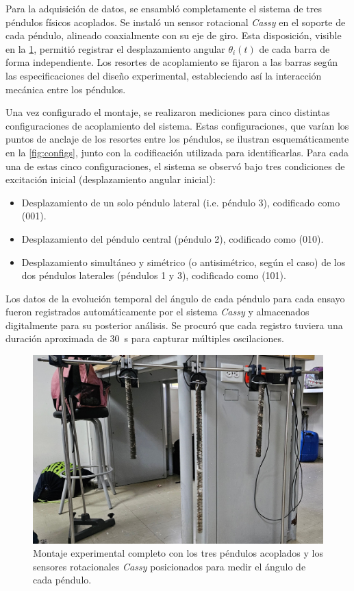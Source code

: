 
Para la adquisición de datos, se ensambló completamente el sistema de
tres péndulos físicos acoplados. Se instaló un sensor rotacional
\emph{Cassy} en el soporte de cada péndulo, alineado coaxialmente con su
eje de giro. Esta disposición, visible en la \cref{fig:set-up},
permitió registrar el desplazamiento angular \(\theta_i(t)\) de cada
barra de forma independiente. Los resortes de acoplamiento se fijaron
a las barras según las especificaciones del diseño experimental,
estableciendo así la interacción mecánica entre los péndulos.

Una vez configurado el montaje, se realizaron mediciones para cinco
distintas configuraciones de acoplamiento del sistema. Estas
configuraciones, que varían los puntos de anclaje de los resortes
entre los péndulos, se ilustran esquemáticamente en la
\cref{fig:configs}, junto con la codificación utilizada para
identificarlas. Para cada una de estas cinco configuraciones,
el sistema se observó bajo tres condiciones de excitación inicial
(desplazamiento angular inicial):
\begin{itemize}
	\item Desplazamiento de un solo péndulo lateral (i.e. péndulo 3),
		codificado como (001).
	\item Desplazamiento del péndulo central (péndulo 2), codificado
		como (010).
	\item Desplazamiento simultáneo y simétrico (o antisimétrico,
		según el caso) de los dos péndulos laterales (péndulos 1 y 3),
		codificado como (101).
\end{itemize}
Los datos de la evolución temporal del ángulo de cada péndulo para
cada ensayo fueron registrados automáticamente por el sistema \emph{Cassy}
y almacenados digitalmente para su posterior análisis. Se procuró
que cada registro tuviera una duración aproximada de
\qty{30}{\second} para capturar múltiples oscilaciones.

\begin{figure}[htbp!]
	\centering
	\includegraphics[width=0.6\linewidth]{./Figures/set-up.jpeg}
	\caption{Montaje experimental completo con los tres péndulos
		acoplados y los sensores rotacionales \emph{Cassy} posicionados para
	medir el ángulo de cada péndulo.}
	\label{fig:set-up}
\end{figure}

